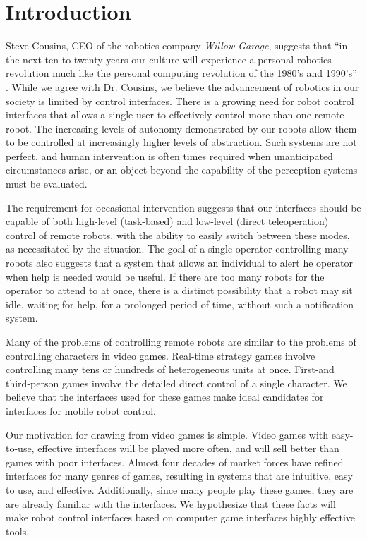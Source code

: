 \chapter{Introduction}
Steve Cousins, CEO of the robotics company \emph{Willow Garage}, suggests that ``in the next ten to twenty years our culture will experience a personal robotics revolution much like the personal computing revolution of the 1980's and 1990's'' \cite{Cousins}. While we agree with Dr. Cousins, we believe the advancement of robotics in our society is limited by control interfaces. There is a growing need for robot control interfaces that allows a single user to effectively control more than one remote robot. The increasing levels of autonomy demonstrated by our robots allow them to be controlled at increasingly higher levels of abstraction. Such systems are not perfect, and human intervention is often times required when unanticipated circumstances arise, or an object beyond the capability of the perception systems must be evaluated.

The requirement for occasional intervention suggests that our interfaces should be capable of both high-level (task-based) and low-level (direct teleoperation) control of remote robots, with the ability to easily switch between these modes, as necessitated by the situation. The goal of a single operator controlling many robots also suggests that a system that allows an individual to alert he operator when help is needed would be useful. If there are too many robots for the operator to attend to at once, there is a distinct possibility that a robot may sit idle, waiting for help, for a prolonged period of time, without such a notification system. 

Many of the problems of controlling remote robots are similar to the problems of controlling characters in video games. Real-time strategy games involve controlling many tens or hundreds of heterogeneous units at once. First-and third-person games involve the detailed direct control of a single character. We believe that the interfaces used for these games make ideal candidates for interfaces for mobile robot control.

Our motivation for drawing from video games is simple. Video games with easy-to-use, effective interfaces will be played more often, and will sell better than games with poor interfaces. Almost four decades of market forces have refined interfaces for many genres of games, resulting in systems that are intuitive, easy to use, and effective. Additionally, since many people play these games, they are are already familiar with the interfaces. We hypothesize that these facts will make robot control interfaces based on computer game interfaces highly effective tools.


